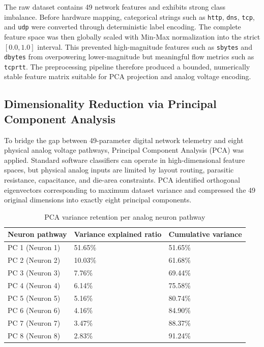 \documentclass{ieeeaccess}
\begin{document}
The raw dataset contains 49 network features and exhibits strong class imbalance. Before hardware mapping, categorical strings such as \texttt{http}, \texttt{dns}, \texttt{tcp}, and \texttt{udp} were converted through deterministic label encoding. The complete feature space was then globally scaled with Min-Max normalization into the strict $[0.0, 1.0]$ interval. This prevented high-magnitude features such as \texttt{sbytes} and \texttt{dbytes} from overpowering lower-magnitude but meaningful flow metrics such as \texttt{tcprtt}. The preprocessing pipeline therefore produced a bounded, numerically stable feature matrix suitable for PCA projection and analog voltage encoding.

\subsection{Dimensionality Reduction via Principal Component Analysis}
To bridge the gap between 49-parameter digital network telemetry and eight physical analog voltage pathways, Principal Component Analysis (PCA) was applied. Standard software classifiers can operate in high-dimensional feature spaces, but physical analog inputs are limited by layout routing, parasitic resistance, capacitance, and die-area constraints. PCA identified orthogonal eigenvectors corresponding to maximum dataset variance and compressed the 49 original dimensions into exactly eight principal components.

\begin{table}[!t]
\centering
\caption{PCA variance retention per analog neuron pathway}
\label{tab:pcavariance}
\begin{tabular}{|p{}|p{}|p{}|}
\hline
\textbf{Neuron pathway} & \textbf{Variance explained ratio} & \textbf{Cumulative variance} \\
\hline
PC 1 (Neuron 1) & 51.65\% & 51.65\% \\
\hline
PC 2 (Neuron 2) & 10.03\% & 61.68\% \\
\hline
PC 3 (Neuron 3) & 7.76\% & 69.44\% \\
\hline
PC 4 (Neuron 4) & 6.14\% & 75.58\% \\
\hline
PC 5 (Neuron 5) & 5.16\% & 80.74\% \\
\hline
PC 6 (Neuron 6) & 4.16\% & 84.90\% \\
\hline
PC 7 (Neuron 7) & 3.47\% & 88.37\% \\
\hline
PC 8 (Neuron 8) & 2.83\% & 91.24\% \\
\hline
\end{tabular}
\end{table}
\end{document}
